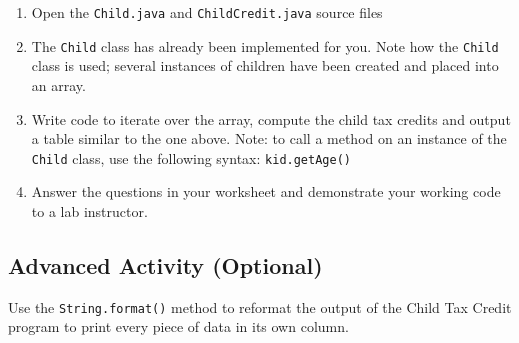 \documentclass[12pt]{scrartcl}
\begin{document}
\begin{enumerate}
  \item Open the \texttt{Child.java} and 
  	\texttt{ChildCredit.java} source files
  \item The \texttt{Child} class has already been implemented
  	for you. Note how the \texttt{Child} class is used; several 
	instances of children have been created and placed into an array.
  \item Write code to iterate over the array, compute the child tax 
	credits and output a table similar to the one above.  Note: to 
	call a method on an instance of the \texttt{Child} class, 
	use the following syntax: \texttt{kid.getAge()}
  \item Answer the questions in your worksheet and demonstrate your 
  	working code to a lab instructor.
\end{enumerate}

\subsection*{Advanced Activity (Optional)}

Use the \texttt{String.format()} method to reformat the 
output of the Child Tax Credit program to print every piece of data 
in its own column.
\end{document}
